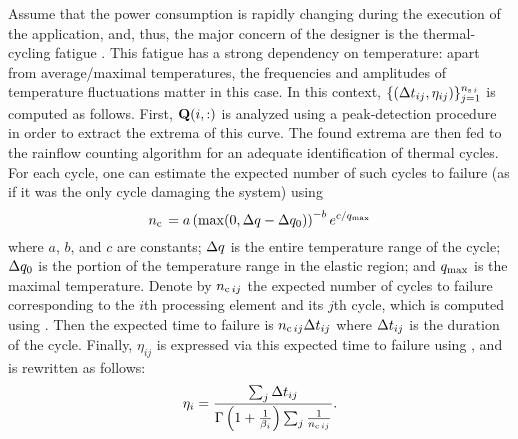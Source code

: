 Assume that the power consumption is rapidly changing during the execution of the application, and, thus, the major concern of the designer is the thermal-cycling fatigue \cite{jedec2011}.
This fatigue has a strong dependency on temperature: apart from average/maximal temperatures, the frequencies and amplitudes of temperature fluctuations matter in this case.
In this context, $\{ (\dt_{ij}, \eta_{ij}) \}_{j = 1}^{\nsegments[i]}$ is computed as follows.
First, $\mQ(i, :)$ is analyzed using a peak-detection procedure in order to extract the extrema of this curve.
The found extrema are then fed to the rainflow counting algorithm \cite{xiang2010} for an adequate identification of thermal cycles.
For each cycle, one can estimate the expected number of such cycles to failure (as if it was the only cycle damaging the system) using
\begin{equation} \elab{thermal-cycling-model}
  \ncycles = a \left(\max( 0, \Delta\q - \Delta\q_0 )\right)^{-b} e^{c / \q_\maximal}
\end{equation}
where $a$, $b$, and $c$ are constants; $\Delta\q$ is the entire temperature range of the cycle; $\Delta\q_0$ is the portion of the temperature range in the elastic region; and $\q_\maximal$ is the maximal temperature.
Denote by $\ncycles[ij]$ the expected number of cycles to failure corresponding to the $i$th processing element and its $j$th cycle, which is computed using .
Then the expected time to failure is $\ncycles[ij] \dt_{ij}$ where $\dt_{ij}$ is the duration of the cycle.
Finally, $\eta_{ij}$ is expressed via this expected time to failure using , and  is rewritten as follows:
\[
  \eta_i = \frac{\sum_j \dt_{ij}}{\Gamma\left(1 + \frac{1}{\beta_i}\right) \sum_j\frac{1}{\ncycles[ij]}}.
\]
